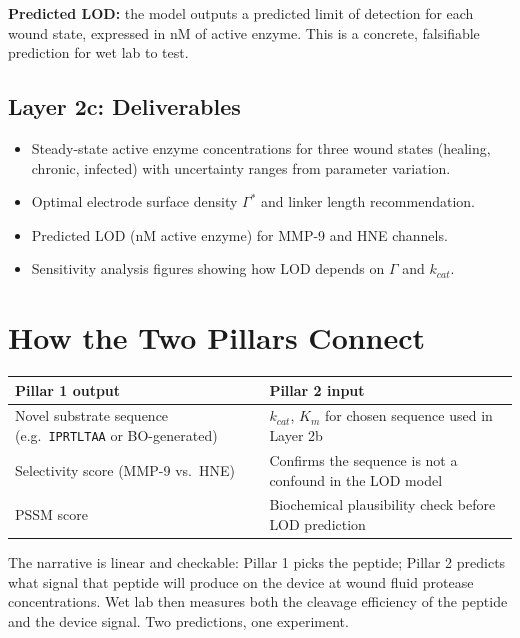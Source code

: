\documentclass[10pt,a4paper]{article}
\newcommand{\seq}[1]{\texttt{#1}}
\begin{document}
\textbf{Predicted LOD:} the model outputs a predicted limit of detection
for each wound state, expressed in nM of active enzyme.  This is a
concrete, falsifiable prediction for wet lab to test.

\subsection{Layer 2c: Deliverables}

\begin{itemize}[topsep=2pt,itemsep=1pt,leftmargin=*]
  \item Steady-state active enzyme concentrations for three wound states
    (healing, chronic, infected) with uncertainty ranges from parameter variation.
  \item Optimal electrode surface density $\Gamma^*$ and linker length recommendation.
  \item Predicted LOD (nM active enzyme) for MMP-9 and HNE channels.
  \item Sensitivity analysis figures showing how LOD depends on $\Gamma$ and $k_{cat}$.
\end{itemize}

\section{How the Two Pillars Connect}

\begin{center}
\small
\begin{tabular}{ll}
  \toprule
  Pillar 1 output & Pillar 2 input\\
  \midrule
  Novel substrate sequence (e.g.\ \seq{IPRTLTAA} or BO-generated) &
    $k_{cat}$, $K_m$ for chosen sequence used in Layer 2b\\
  Selectivity score (MMP-9 vs.\ HNE) &
    Confirms the sequence is not a confound in the LOD model\\
  PSSM score &
    Biochemical plausibility check before LOD prediction\\
  \bottomrule
\end{tabular}
\end{center}

\medskip
The narrative is linear and checkable: Pillar 1 picks the peptide;
Pillar 2 predicts what signal that peptide will produce on the device
at wound fluid protease concentrations.  Wet lab then measures both
the cleavage efficiency of the peptide and the device signal.
Two predictions, one experiment.
\end{document}
